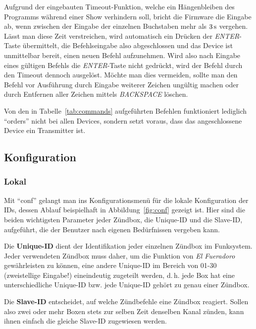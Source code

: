 \documentclass[pdftex, parskip, numbers=noenddot, toc=listof]{scrbook}
\newcommand{\anlage}{\emph{El Fueradoro}}
\begin{document}
				Aufgrund der eingebauten Timeout-Funktion, welche ein Hängenbleiben des Programms während einer Show verhindern soll, bricht die Firmware die Eingabe ab, wenn zwischen der Eingabe der einzelnen Buchstaben mehr als $\unit[3]{s}$ vergehen. Lässt man diese Zeit verstreichen, wird automatisch ein Drücken der \emph{ENTER}-Taste übermittelt, die Befehlseingabe also abgeschlossen und das Device ist unmittelbar bereit, einen neuen Befehl aufzunehmen. Wird also nach Eingabe eines gültigen Befehls die \emph{ENTER}-Taste nicht gedrückt, wird der Befehl durch den Timeout dennoch ausgelöst. Möchte man dies vermeiden, sollte man den Befehl vor Ausführung durch Eingabe weiterer Zeichen ungültig machen oder durch Entfernen aller Zeichen mittels \emph{BACKSPACE} löschen.

				Von den in Tabelle~\ref{tab:commands} aufgeführten Befehlen funktioniert lediglich \enquote{orders} nicht bei allen Devices, sondern setzt voraus, dass das angeschlossene Device ein Transmitter ist.


			\subsection{Konfiguration}
				\label{sec:config}

				\subsubsection{Lokal}
					\label{subsec:localconf}

					Mit \enquote{conf} gelangt man ins Konfigurationsmenü für die lokale Konfiguration der IDs, dessen Ablauf beispielhaft in Abbildung~\ref{fig:conf} gezeigt ist. Hier sind die beiden wichtigsten Parameter jeder Zündbox, die Unique-ID und die Slave-ID, aufgeführt, die der Benutzer nach eigenen Bedürfnissen vergeben kann.

					Die \textbf{Unique-ID} dient der Identifikation jeder einzelnen Zündbox im Funksystem. Jeder verwendeten Zündbox muss daher, um die Funktion von {\anlage} gewährleisten zu können, eine andere Unique-ID im Bereich von 01-30 (zweistellige Eingabe!) eineindeutig zugeteilt werden, d.\,h. jede Box hat eine unterschiedliche Unique-ID bzw. jede Unique-ID gehört zu genau einer Zündbox.

					Die \textbf{Slave-ID} entscheidet, auf welche Zündbefehle eine Zündbox reagiert. Sollen also zwei oder mehr Boxen stets zur selben Zeit denselben Kanal zünden, kann ihnen einfach die gleiche Slave-ID zugewiesen werden.
\end{document}
